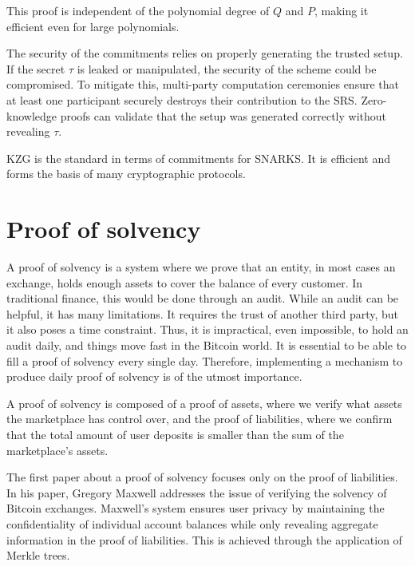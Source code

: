 This proof is independent of the polynomial degree of $Q$ and $P$, making it efficient even for large polynomials.


The security of the commitments relies on properly generating the trusted setup. 
If the secret $\tau$ is leaked or manipulated, the security of the scheme could be compromised. 
To mitigate this, multi-party computation ceremonies ensure that at least one participant securely destroys their contribution to the SRS. 
Zero-knowledge proofs can validate that the setup was generated correctly without revealing $\tau$.

KZG is the standard in terms of commitments for SNARKS. It is efficient and forms the basis of many cryptographic protocols. \cite{vODC24}


\section{Proof of solvency}

A proof of solvency is a system where we prove that an entity, in most cases an exchange, holds enough assets to cover
the balance of every customer. In traditional finance, this would be done through an audit. While an audit can be helpful,
it has many limitations. It requires the trust of another third party, but it also poses a time constraint. Thus, it is impractical, even impossible, to hold an audit daily, and things move fast in the Bitcoin world. It is essential to be able to fill a proof of solvency every single day.
Therefore, implementing a mechanism to produce daily proof of solvency is of the utmost importance.

A proof of solvency is composed of a proof of assets, where we verify what assets the marketplace has control over, and the proof of liabilities, 
where we confirm that the total amount of user deposits is smaller than the sum of the marketplace's assets.

The first paper about a proof of solvency focuses only on the proof of liabilities. In his paper, Gregory Maxwell addresses the issue of verifying
the solvency of Bitcoin exchanges. \cite{chainlink_blog}
Maxwell's system ensures user privacy by maintaining the confidentiality of individual account balances while only revealing aggregate information in the proof of liabilities.
This is achieved through the application of Merkle trees.


